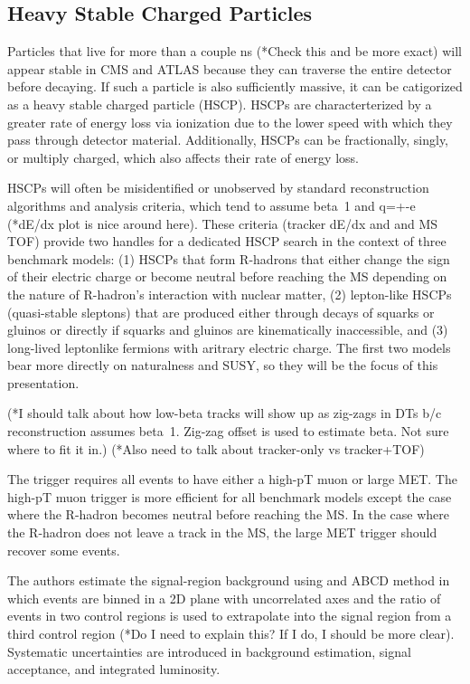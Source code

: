 \documentclass[12pt]{article}
\begin{document}
\subsection{Heavy Stable Charged Particles}
            Particles that live for more than a couple ns (*Check this and be more exact) will appear stable in CMS and ATLAS because they can traverse the entire detector before decaying. If such a particle is also sufficiently massive, it can be catigorized as a heavy stable charged particle (HSCP). HSCPs are characterterized by a greater rate of energy loss via ionization due to the lower speed with which they pass through detector material. Additionally, HSCPs can be fractionally, singly, or multiply charged, which also affects their rate of energy loss. 

            HSCPs will often be misidentified or unobserved by standard reconstruction algorithms and analysis criteria, which tend to assume beta~1 and q=+-e (*dE/dx plot is nice around here). These criteria (tracker dE/dx and and MS TOF) provide two handles for a dedicated HSCP search in the context of three benchmark models: (1) HSCPs that form R-hadrons that either change the sign of their electric charge or become neutral before reaching the MS depending on the nature of R-hadron's interaction with nuclear matter, (2) lepton-like HSCPs (quasi-stable sleptons) that are produced either through decays of squarks or gluinos or directly if squarks and gluinos are kinematically inaccessible, and (3) long-lived leptonlike fermions with aritrary electric charge. The first two models bear more directly on naturalness and SUSY, so they will be the focus of this presentation.

            (*I should talk about how low-beta tracks will show up as zig-zags in DTs b/c reconstruction assumes beta~1. Zig-zag offset is used to estimate beta. Not sure where to fit it in.) (*Also need to talk about tracker-only vs tracker+TOF)

            The trigger requires all events to have either a high-pT muon or large MET. The high-pT muon trigger is more efficient for all benchmark models except the case where the R-hadron becomes neutral before reaching the MS. In the case where the R-hadron does not leave a track in the MS, the large MET trigger should recover some events.  

            The authors estimate the signal-region background using and ABCD method in which events are binned in a 2D plane with uncorrelated axes and the ratio of events in two control regions is used to extrapolate into the signal region from a third control region (*Do I need to explain this? If I do, I should be more clear). Systematic uncertainties are introduced in background estimation, signal acceptance, and integrated luminosity.
\end{document}
